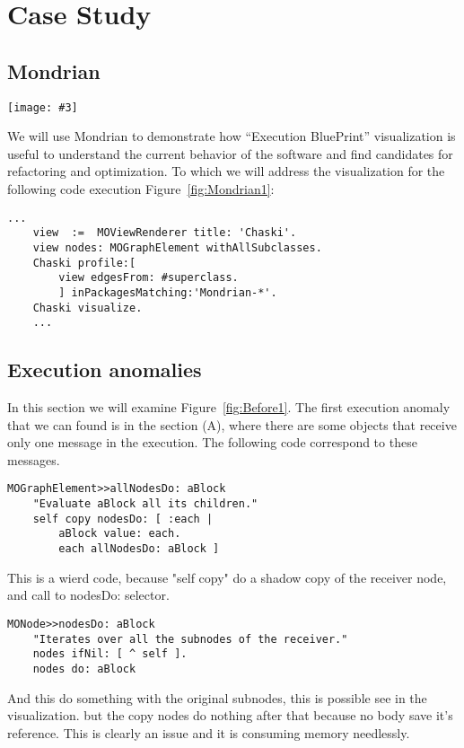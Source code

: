 \documentclass{sig-alternate}
\newcommand{\largefig}[4]{
	\begin{figure*}[#1]
		\centering
		\texttt{[image: \#3]}
		\caption{\label{fig:#3}#4}
	\end{figure*}}
\newcommand{\seclabel}[1]{\label{sec:#1}}
\newcommand{\figref}[1]{Figure~\ref{fig:#1}}
\begin{document}
\section{Case Study}\seclabel{case study}

\subsection{Mondrian}

\largefig{}{1.0}{Before1}{Execution anomalies}
We will use Mondrian to demonstrate how ``Execution BluePrint'' visualization is useful to understand the current behavior of the software and find candidates for refactoring and optimization. To which we will address the visualization for the following code execution \figref{Mondrian1}:
\begin{lstlisting}[language=Smalltalk]
	...
	view  :=  MOViewRenderer title: 'Chaski'.
	view nodes: MOGraphElement withAllSubclasses.
	Chaski profile:[ 
		view edgesFrom: #superclass.
		] inPackagesMatching:'Mondrian-*'.
	Chaski visualize.
	...
\end{lstlisting}


\subsection{Execution anomalies}

In this section we will examine \figref{Before1}. The first execution anomaly that we can found is in the section (A), where there are some objects that receive only one message in the execution. The following code correspond to these messages.

\begin{lstlisting}[language=Smalltalk]
MOGraphElement>>allNodesDo: aBlock
	"Evaluate aBlock all its children."
	self copy nodesDo: [ :each |
		aBlock value: each.
		each allNodesDo: aBlock ]
\end{lstlisting} 

This is a wierd code, because "self copy" do a shadow copy of the receiver node, and call to nodesDo: selector.

\begin{lstlisting}[language=Smalltalk]
MONode>>nodesDo: aBlock
	"Iterates over all the subnodes of the receiver."	
	nodes ifNil: [ ^ self ].
	nodes do: aBlock
\end{lstlisting} 

And this do something with the original subnodes, this is possible see in the visualization. but the copy nodes do nothing after that because no body save it's reference. This is clearly an issue  and it is consuming memory needlessly.
\end{document}
